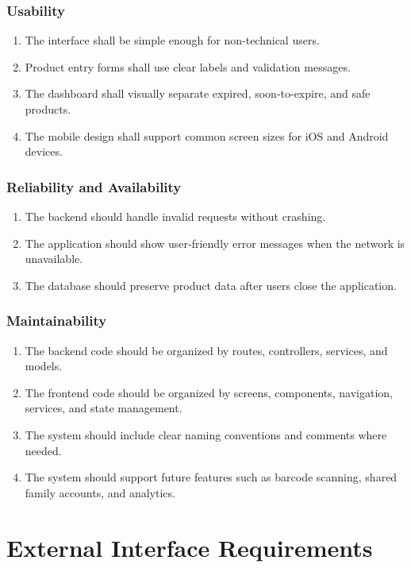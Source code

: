 \documentclass[12pt]{article}
\begin{document}
\subsubsection{Usability}
\begin{enumerate}[label=NFR-\arabic*. ,resume]
    \item The interface shall be simple enough for non-technical users.
    \item Product entry forms shall use clear labels and validation messages.
    \item The dashboard shall visually separate expired, soon-to-expire, and safe products.
    \item The mobile design shall support common screen sizes for iOS and Android devices.
\end{enumerate}

\subsubsection{Reliability and Availability}
\begin{enumerate}[label=NFR-\arabic*. ,resume]
    \item The backend should handle invalid requests without crashing.
    \item The application should show user-friendly error messages when the network is unavailable.
    \item The database should preserve product data after users close the application.
\end{enumerate}

\subsubsection{Maintainability}
\begin{enumerate}[label=NFR-\arabic*. ,resume]
    \item The backend code should be organized by routes, controllers, services, and models.
    \item The frontend code should be organized by screens, components, navigation, services, and state management.
    \item The system should include clear naming conventions and comments where needed.
    \item The system should support future features such as barcode scanning, shared family accounts, and analytics.
\end{enumerate}

\section{External Interface Requirements}
\end{document}
